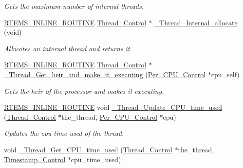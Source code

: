\begin{DoxyCompactItemize}
\begin{DoxyCompactList}\small\item\em Gets the maximum number of internal threads. \end{DoxyCompactList}\item 
\mbox{\hyperlink{group__RTEMSScoreBaseDefs_gac216239df231d5dbd15e3520b0b9313f}{R\+T\+E\+M\+S\+\_\+\+I\+N\+L\+I\+N\+E\+\_\+\+R\+O\+U\+T\+I\+NE}} \mbox{\hyperlink{struct__Thread__Control}{Thread\+\_\+\+Control}} $\ast$ \mbox{\hyperlink{group__RTEMSScoreThread_ga176ea118dfa11ed7460dd0b072f1c8a8}{\+\_\+\+Thread\+\_\+\+Internal\+\_\+allocate}} (void)
\begin{DoxyCompactList}\small\item\em Allocates an internal thread and returns it. \end{DoxyCompactList}\item 
\mbox{\hyperlink{group__RTEMSScoreBaseDefs_gac216239df231d5dbd15e3520b0b9313f}{R\+T\+E\+M\+S\+\_\+\+I\+N\+L\+I\+N\+E\+\_\+\+R\+O\+U\+T\+I\+NE}} \mbox{\hyperlink{struct__Thread__Control}{Thread\+\_\+\+Control}} $\ast$ \mbox{\hyperlink{group__RTEMSScoreThread_gacd7c2e371fbc36ba623dffe713e6c427}{\+\_\+\+Thread\+\_\+\+Get\+\_\+heir\+\_\+and\+\_\+make\+\_\+it\+\_\+executing}} (\mbox{\hyperlink{structPer__CPU__Control}{Per\+\_\+\+C\+P\+U\+\_\+\+Control}} $\ast$cpu\+\_\+self)
\begin{DoxyCompactList}\small\item\em Gets the heir of the processor and makes it executing. \end{DoxyCompactList}\item 
\mbox{\hyperlink{group__RTEMSScoreBaseDefs_gac216239df231d5dbd15e3520b0b9313f}{R\+T\+E\+M\+S\+\_\+\+I\+N\+L\+I\+N\+E\+\_\+\+R\+O\+U\+T\+I\+NE}} void \mbox{\hyperlink{group__RTEMSScoreThread_ga02a75f308e726ba3f36a97cd758a8e7e}{\+\_\+\+Thread\+\_\+\+Update\+\_\+\+C\+P\+U\+\_\+time\+\_\+used}} (\mbox{\hyperlink{struct__Thread__Control}{Thread\+\_\+\+Control}} $\ast$the\+\_\+thread, \mbox{\hyperlink{structPer__CPU__Control}{Per\+\_\+\+C\+P\+U\+\_\+\+Control}} $\ast$cpu)
\begin{DoxyCompactList}\small\item\em Updates the cpu time used of the thread. \end{DoxyCompactList}\item 
void \mbox{\hyperlink{group__RTEMSScoreThread_gaade6e27239f8126f2c2848e7e2ec7244}{\+\_\+\+Thread\+\_\+\+Get\+\_\+\+C\+P\+U\+\_\+time\+\_\+used}} (\mbox{\hyperlink{struct__Thread__Control}{Thread\+\_\+\+Control}} $\ast$the\+\_\+thread, \mbox{\hyperlink{group__SuperCoreTimeStamp_ga8508036506d5211c98844c88045e2410}{Timestamp\+\_\+\+Control}} $\ast$cpu\+\_\+time\+\_\+used)

\end{DoxyCompactItemize}
